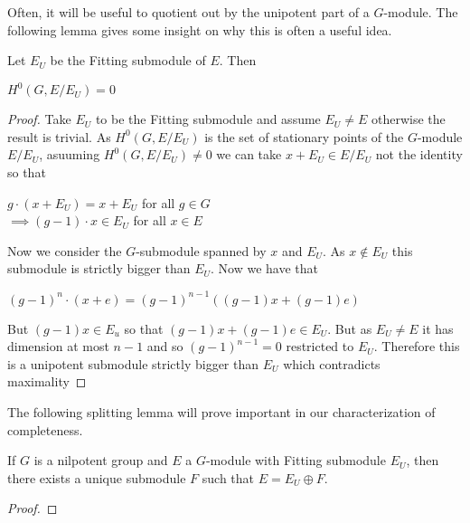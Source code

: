 Often, it will be useful to quotient out by the unipotent part of a $G$-module.
The following lemma gives some insight on why this is often a useful idea.

\begin{lemma}
    Let $E_U$ be the Fitting submodule of $E$. Then
    \begin{center}
        $H^0(G, E/E_U) = 0$
    \end{center}
\end{lemma}

\begin{proof}
    Take $E_U$ to be the Fitting submodule and assume $E_U \neq E$ otherwise the result is trivial.
    As $H^0(G, E/E_U)$ is the set of stationary points of the $G$-module $E/E_U$, asuuming $H^0(G, E/E_U)\neq0$
    we can take $x + E_U \in E/E_U$ not the identity so that
    \begin{center}
        $g\cdot (x + E_U) = x+ E_U$ for all $g \in G$ \\
        $ \implies (g - 1)\cdot x \in E_U$ for all $x \in E$
    \end{center}
    Now we consider the $G$-submodule spanned by $x$ and $E_U$. As $x \notin E_U$ this submodule
    is strictly bigger than $E_U$. Now we have that
    \begin{center}
        $(g-1)^n\cdot (x + e) = (g-1)^{n-1}((g-1)x + (g-1)e)$
    \end{center}
    But $(g-1)x \in E_u$ so that $(g-1)x + (g-1)e \in E_U$. But as $E_U \neq E$ it has dimension at most
    $n-1$ and so $(g-1)^{n-1} = 0$ restricted to $E_U$. Therefore this is a unipotent submodule strictly bigger
    than $E_U$ which contradicts maximality
\end{proof}

The following splitting lemma will prove important in our characterization of
completeness.

\begin{lemma}
    If $G$ is a nilpotent group and $E$ a $G$-module with Fitting submodule $E_U$, then there exists a
    unique submodule $F$ such that $E = E_U \oplus F$.
\end{lemma}
\begin{proof}

\end{proof}